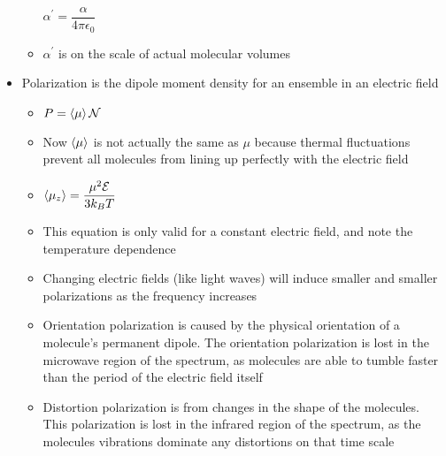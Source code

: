 \documentclass[12pt, openany, letterpaper]{memoir}
\begin{document}
\begin{itemize}
\begin{itemize}
		$\alpha^\prime = \dfrac{\alpha}{4\pi\epsilon_0}$
		\item $\alpha^\prime$ is on the scale of actual molecular volumes
	\end{itemize}
	\item Polarization is the dipole moment density for an ensemble in an electric field
	\begin{itemize}
		\item $P=\left< \mu \right>\mathcal{N}$
		\item Now $\left< \mu \right>$ is not actually the same as $\mu$ because thermal fluctuations prevent all molecules from lining up perfectly with the electric field
		\item $\left< \mu_z \right>=\dfrac{\mu^2\mathcal{E}}{3k_BT}$
		\item This equation is only valid for a constant electric field, and note the temperature dependence
		\item Changing electric fields (like light waves) will induce smaller and smaller polarizations as the frequency increases
		\item Orientation polarization is caused by the physical orientation of a molecule's permanent dipole. The orientation polarization is lost in the microwave region of the spectrum, as molecules are able to tumble faster than the period of the electric field itself
		\item Distortion polarization is from changes in the shape of the molecules. This polarization is lost in the infrared region of the spectrum, as the molecules vibrations dominate any distortions on that time scale
	\end{itemize}
\end{itemize}
\end{document}
